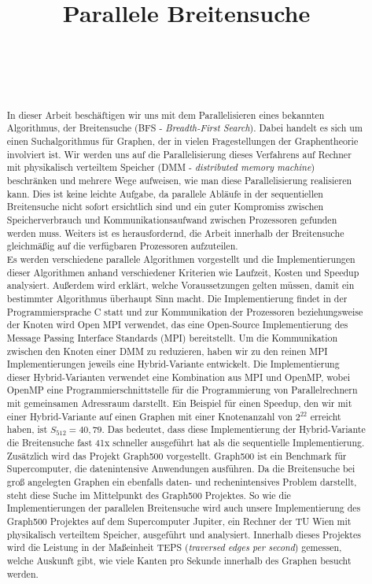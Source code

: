 \documentclass[11pt,a4paper]{article}
\title{Parallele Breitensuche}
\author{
 \authorname{Alexander Gallauner} \\
 \studentnumber{1026090} \\
 \curriculum{534} \\
 \email{alexander.gallauner@gmail.com}
}
\begin{document}
\maketitle
\begin{abstract}
In dieser Arbeit beschäftigen wir uns mit dem Parallelisieren eines bekannten Algorithmus, der Breitensuche (BFS - \textit{Breadth-First Search}). Dabei handelt es sich um einen Suchalgorithmus für Graphen, der in vielen Fragestellungen der Graphentheorie involviert ist. Wir werden uns auf die Parallelisierung dieses Verfahrens auf Rechner mit physikalisch verteiltem Speicher (DMM - \textit{distributed memory machine}) beschränken und mehrere Wege aufweisen, wie man diese Parallelisierung realisieren kann. Dies ist keine leichte Aufgabe, da parallele Abläufe in der sequentiellen Breitensuche nicht sofort ersichtlich sind und ein guter Kompromiss zwischen Speicherverbrauch und Kommunikationsaufwand zwischen Prozessoren gefunden werden muss. Weiters ist es herausfordernd, die Arbeit innerhalb der Breitensuche gleichmäßig auf die verfügbaren Prozessoren aufzuteilen.\\
Es werden verschiedene parallele Algorithmen vorgestellt und die Implementierungen dieser Algorithmen anhand verschiedener Kriterien wie Laufzeit, Kosten und Speedup analysiert. Außerdem wird erklärt, welche Voraussetzungen gelten müssen, damit ein bestimmter Algorithmus überhaupt Sinn macht. Die Implementierung findet in der Programmiersprache C statt und zur Kommunikation der Prozessoren beziehungsweise der Knoten wird Open MPI verwendet, das eine Open-Source Implementierung des Message Passing Interface Standards (MPI) bereitstellt. Um die Kommunikation zwischen den Knoten einer  DMM zu reduzieren, haben wir zu den reinen MPI Implementierungen jeweils eine Hybrid-Variante entwickelt. Die Implementierung dieser Hybrid-Varianten verwendet eine Kombination aus MPI und OpenMP, wobei OpenMP eine Programmierschnittstelle für die Programmierung von Parallelrechnern mit gemeinsamen Adressraum darstellt. Ein Beispiel für einen Speedup, den wir mit einer Hybrid-Variante auf einen Graphen mit einer Knotenanzahl von \(2^{22}\) erreicht haben, ist \(S_{512} = 40,79\). Das bedeutet, dass diese Implementierung der Hybrid-Variante die Breitensuche fast 41x schneller ausgeführt hat als die sequentielle Implementierung.\\
Zusätzlich wird das Projekt Graph500 vorgestellt. Graph500 ist ein Benchmark für Supercomputer, die datenintensive Anwendungen ausführen. Da die Breitensuche bei groß angelegten Graphen ein ebenfalls daten- und rechenintensives Problem darstellt, steht diese Suche im Mittelpunkt des Graph500 Projektes. So wie die Implementierungen der parallelen Breitensuche wird auch unsere Implementierung des Graph500 Projektes auf dem Supercomputer Jupiter, ein Rechner der TU Wien mit physikalisch verteiltem Speicher, ausgeführt und analysiert. Innerhalb dieses Projektes wird die Leistung in der Maßeinheit TEPS (\textit{traversed edges per second}) gemessen, welche Auskunft gibt, wie viele Kanten pro Sekunde innerhalb des Graphen besucht werden.
\end{abstract}
\clearpage
\end{document}

